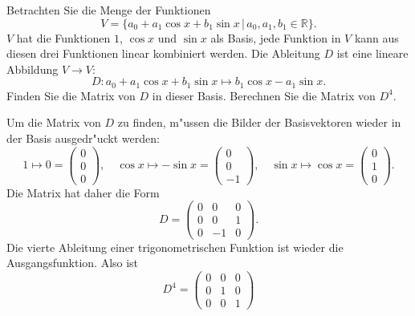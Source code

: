 Betrachten Sie die Menge der Funktionen
\[
V=\{
a_0+a_1\cos x+b_1\sin x\,|\,a_0,a_1,b_1\in\mathbb R\}.
\]
$V$ hat die Funktionen $1$, $\cos x$ und $\sin x$ als Basis,
jede Funktion in $V$ kann aus diesen drei Funktionen linear
kombiniert werden.
Die Ableitung $D$ ist eine lineare Abbildung $V\to V$:
\[
D:a_0+a_1\cos x+b_1\sin x\mapsto b_1\cos x -a_1\sin x.
\]
Finden Sie die Matrix von $D$ in dieser Basis. Berechnen Sie
die Matrix von $D^4$.

\begin{loesung}
Um die Matrix von $D$ zu finden, m"ussen die Bilder der
Basisvektoren wieder in der Basis ausgedr"uckt werden:
\[
1\mapsto 0=\begin{pmatrix}0\\0\\0\end{pmatrix},\quad
\cos x\mapsto -\sin x=\begin{pmatrix}0\\0\\-1\end{pmatrix},\quad
\sin x\mapsto \cos x=\begin{pmatrix}0\\1\\0\end{pmatrix}.
\]
Die Matrix hat daher die Form
\[
D=\begin{pmatrix}
0&0&0\\
0&0&1\\
0&-1&0
\end{pmatrix}.
\]
Die vierte Ableitung einer trigonometrischen Funktion ist wieder
die Ausgangsfunktion. Also ist
\[
D^4=\begin{pmatrix}
0&0&0\\
0&1&0\\
0&0&1
\end{pmatrix}
\]
\end{loesung}

